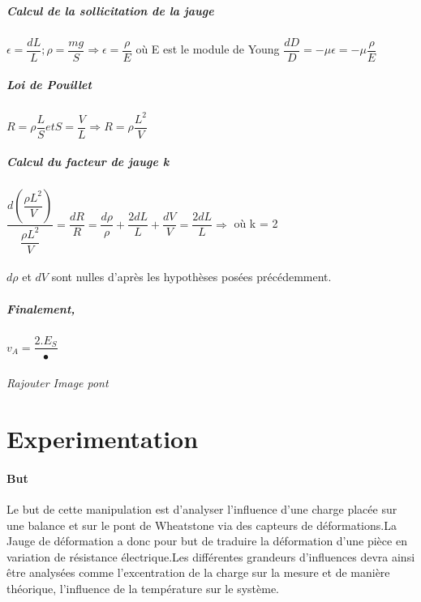 \documentclass[11pt,a4paper]{report}
\begin{document}
\subsubsection*{Calcul de la sollicitation de la jauge}
$\epsilon = \dfrac{dL}{L} ; \rho = \dfrac{mg}{S} \Rightarrow \epsilon = \dfrac{\rho}{E}$ où E est le module de Young 
$\dfrac{dD}{D} = - \mu \epsilon = - \mu \dfrac{\rho}{E}$
\subsubsection{Loi de Pouillet}
$R = \rho \dfrac{L}{S} et S  = \dfrac{V}{L} \Rightarrow R = \rho \dfrac{L^{2}}{V}$ 
\subsubsection{Calcul du facteur de jauge k}
$\dfrac{d(\dfrac{\rho L^{2}}{V})}{\dfrac{\rho L^{2}}{V}} = \dfrac{dR}{R} = \dfrac{d\rho}{\rho} + \dfrac{2dL}{L}+\dfrac{dV}{V}  =  \dfrac{2dL}{L} \Rightarrow$ où k = 2
~\\~\\
$d\rho$ et $dV$ sont nulles d'après les hypothèses posées précédemment.~\\
\subsubsection{Finalement,}
$v_{A} = \dfrac{2.E_{S}}{•}$

\paragraph{Rajouter Image pont}
\part{Experimentation}
\subsection*{But}

Le but de cette manipulation est d'analyser l'influence d'une charge placée sur une balance et sur le pont de Wheatstone via des capteurs de déformations.La Jauge de déformation a donc pour but de traduire la déformation d'une pièce en variation de résistance électrique.Les différentes grandeurs d'influences devra ainsi être analysées comme l'excentration de la charge sur la mesure et de manière théorique, l'influence de la température sur le système.
\end{document}
